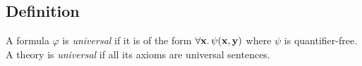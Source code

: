\subsection{Definition}
\begin{definition}
    A formula \( \varphi \) is \emph{universal} if it is of the form \( \forall \vb x.\, \psi(\vb x, \vb y) \) where \( \psi \) is quantifier-free.
    A theory is \emph{universal} if all its axioms are universal sentences.
\end{definition}
